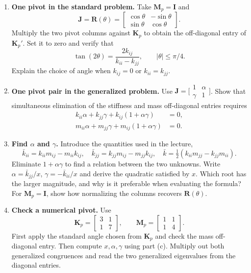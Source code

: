 \documentclass[12pt]{article}
\newcommand{\vct}[1]{\mathbf{#1}}
\newcommand{\colv}[1]{\begin{bmatrix}#1\end{bmatrix}}
\begin{document}
\begin{enumerate}
  \item \textbf{One pivot in the standard problem.} Take $\vct M_p=\vct I$ and
        \[
          \vct J=\vct R(\theta)=
          \colv{\cos\theta&-\sin\theta\\ \sin\theta&\cos\theta}.
        \]
        Multiply the two pivot columns against $\vct K_p$ to obtain the
        off-diagonal entry of $\vct K_p'$. Set it to zero and verify that
        \[
          \tan(2\theta)=\frac{2k_{ij}}{k_{ii}-k_{jj}},\qquad |\theta|\leq\pi/4 .
        \]
        Explain the choice of angle when $k_{ij}=0$ or $k_{ii}=k_{jj}$.
  \item \textbf{One pivot pair in the generalized problem.} Use
        $\vct J=\bigl[\begin{smallmatrix}1&\alpha\\\gamma&1\end{smallmatrix}\bigr]$.
        Show that simultaneous elimination of the stiffness and mass off-diagonal
        entries requires
        \begin{align*}
          k_{ii}\alpha+k_{jj}\gamma+k_{ij}(1+\alpha\gamma) & =0, \\
          m_{ii}\alpha+m_{jj}\gamma+m_{ij}(1+\alpha\gamma) & =0.
        \end{align*}
  \item \textbf{Find $\alpha$ and $\gamma$.} Introduce the quantities used in
        the lecture,
        \[
          \bar k_{ii}=k_{ii}m_{ij}-m_{ii}k_{ij},\quad
          \bar k_{jj}=k_{jj}m_{ij}-m_{jj}k_{ij},\quad
          \bar k=\tfrac12(k_{ii}m_{jj}-k_{jj}m_{ii}).
        \]
        Eliminate $1+\alpha\gamma$ to find a relation between the two unknowns.
        Write $\alpha=\bar k_{jj}/x$, $\gamma=-\bar k_{ii}/x$ and derive the
        quadratic satisfied by $x$. Which root has the larger magnitude, and why
        is it preferable when evaluating the formula? For $\vct M_p=\vct I$,
        show how normalizing the columns recovers $\vct R(\theta)$.
  \item \textbf{Check a numerical pivot.} Use
        \[
          \vct K_p=\colv{3&1\\1&7},\qquad \vct M_p=\colv{1&1\\1&4}.
        \]
        First apply the standard angle chosen from $\vct K_p$ and check the mass
        off-diagonal entry. Then compute $x,\alpha,\gamma$ using part (c).
        Multiply out both generalized congruences and read the two generalized
        eigenvalues from the diagonal entries.
\end{enumerate}
\end{document}
